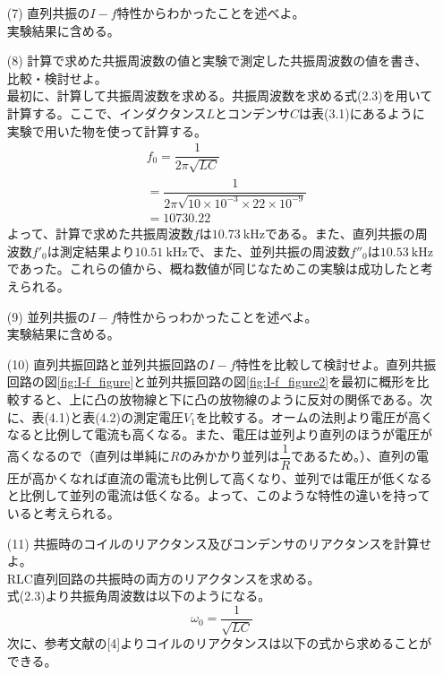 \documentclass[12pt,a4paper]{jsarticle}
\numberwithin{equation}{section}
\numberwithin{figure}{section}
\numberwithin{table}{section}
\begin{document}
\begin{itemize}
    \item [(7)]直列共振の$I-f$特性からわかったことを述べよ。\\実験結果に含める。
    \item [(8)]計算で求めた共振周波数の値と実験で測定した共振周波数の値を書き、比較・検討せよ。\\
    最初に、計算して共振周波数を求める。共振周波数を求める式(2.3)を用いて計算する。ここで、インダクタンス$L$とコンデンサ$C$は表(3.1)にあるように実験で用いた物を使って計算する。
    \begin{equation}
      \begin{split}
        &f_0=\dfrac{1}{2 \pi \sqrt{LC}}\\
        &=\dfrac{1}{2 \pi \sqrt{10 \times 10^{-3} \times 22 \times 10^{-9}}}\\
        &=10730.22
      \end{split}
    \end{equation}
    よって、計算で求めた共振周波数$f$は$\SI{10.73}{\kilo\hertz}$である。また、直列共振の周波数$f'_0$は測定結果より$\SI{10.51}{\kilo\hertz}$で、また、並列共振の周波数$f''_0$は$\SI{10.53}{\kilo\hertz}$であった。これらの値から、概ね数値が同じなためこの実験は成功したと考えられる。
    \item [(9)]並列共振の$I-f$特性からっわかったことを述べよ。\\実験結果に含める。
    \item[(10)]直列共振回路と並列共振回路の$I-f$特性を比較して検討せよ。直列共振回路の図\ref{fig:I-f_figure}と並列共振回路の図\ref{fig:I-f_figure2}を最初に概形を比較すると、上に凸の放物線と下に凸の放物線のように反対の関係である。次に、表(4.1)と表(4.2)の測定電圧$V_1$を比較する。オームの法則より電圧が高くなると比例して電流も高くなる。また、電圧は並列より直列のほうが電圧が高くなるので（直列は単純に$R$のみかかり並列は$\dfrac{1}{R}$であるため。）、直列の電圧が高かくなれば直流の電流も比例して高くなり、並列では電圧が低くなると比例して並列の電流は低くなる。よって、このような特性の違いを持っていると考えられる。
    \item[(11)]共振時のコイルのリアクタンス及びコンデンサのリアクタンスを計算せよ。\\
    RLC直列回路の共振時の両方のリアクタンスを求める。\\式(2.3)より共振角周波数は以下のようになる。
    \begin{equation}
      \omega_0=\dfrac{1}{\sqrt{LC}}
    \end{equation}
    次に、参考文献の[4]よりコイルのリアクタンスは以下の式から求めることができる。

\end{itemize}
\end{document}
